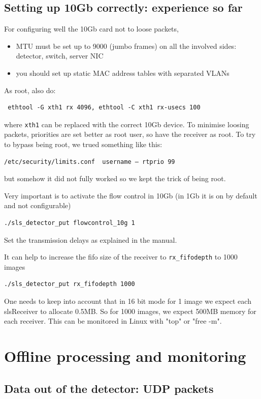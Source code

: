 \documentclass{article}
\begin{document}
\begin{itemize}
\end{itemize}
\subsection{Setting up 10Gb correctly: experience so far}\label{10g}

For configuring well the 10Gb card not to loose packets, 
\begin{itemize}
\item MTU must be set up to 9000 (jumbo frames) on all the involved sides: detector, switch, server NIC
\item you should set up static MAC address tables with separated VLANs
\end{itemize}
As root, also do:
\begin{verbatim}
 ethtool -G xth1 rx 4096, ethtool -C xth1 rx-usecs 100 
\end{verbatim}
where {\tt{xth1}} can be replaced with the correct 10Gb device. To minimise loosing packets, priorities are set better as root user, so have the receiver as root.
To try to bypass being root, we trued something like this:
\begin{verbatim}
/etc/security/limits.conf  username – rtprio 99
\end{verbatim}
but somehow it did  not fully worked  so we kept the trick of being root.

Very important is to activate the flow control in 10Gb (in 1Gb it is on by default and not configurable)
\begin{verbatim}
./sls_detector_put flowcontrol_10g 1
\end{verbatim}
Set the transmission delays as explained in the manual.

It can help to increase the fifo size of the receiver to {\tt{rx\_fifodepth}} to 1000 images
\begin{verbatim}
./sls_detector_put rx_fifodepth 1000
\end{verbatim}
One needs to keep into account that in 16 bit mode for 1 image we expect each slsReceiver  to allocate 0.5MB. So for 1000 images, we expect  500MB memory for each receiver. This can be monitored in Linux with "top" or "free -m".

\section{Offline processing and monitoring}

\subsection{Data out of the detector: UDP packets}\label{UDP}
\end{document}
